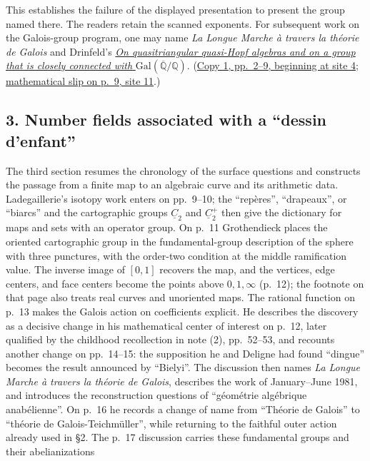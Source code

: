 \documentclass[11pt,a4paper]{article}
\begin{document}
This establishes the
failure of the displayed presentation to present the group named there.
The readers retain the scanned exponents. For subsequent work on the
Galois-group program, one may name \emph{La Longue Marche à travers la
théorie de Galois} and Drinfeld's
\href{https://www.mathnet.ru/eng/aa199}{\emph{On quasitriangular quasi-Hopf algebras and on a group that is closely connected with}
$\mathrm{Gal}(\overline{\mathbb Q}/\mathbb Q)$}.
(\href{https://grothendieck.umontpellier.fr/web/viewer.html?file=../119.pdf\#page=5}{Copy 1, pp.~2--9, beginning at site 4};
\href{https://grothendieck.umontpellier.fr/web/viewer.html?file=../119.pdf\#page=12}{mathematical slip on p.~9, site 11}.)



\subsection*{3. Number fields associated with a ``dessin d'enfant''}
The third section resumes the chronology of the surface questions and
constructs the passage from a finite map to an algebraic curve and its
arithmetic data. Ladegaillerie's isotopy work enters on pp.~9--10; the
``repères'', ``drapeaux'', or ``biarcs'' and the cartographic groups
$\underline C_2$ and $\underline C_2^+$ then give the dictionary for maps
and sets with an operator group. On p.~11 Grothendieck places the oriented
cartographic group in the fundamental-group description of the sphere
with three punctures, with the order-two condition at the middle
ramification value. The inverse image of $[0,1]$ recovers the map, and
the vertices, edge centers, and face centers become the points above
$0,1,\infty$ (p.~12); the footnote on that page also treats real curves
and unoriented maps. The rational function on p.~13 makes the Galois
action on coefficients explicit. He describes the discovery as a decisive
change in his mathematical center of interest on p.~12, later qualified
by the childhood recollection in note (2), pp.~52--53, and recounts
another change on pp.~14--15: the supposition he and Deligne had found
``dingue'' becomes the result announced by ``Bielyi''. The discussion then
names \emph{La Longue Marche à travers la théorie de Galois}, describes
the work of January--June 1981, and introduces the reconstruction questions
of ``géométrie algébrique anabélienne''. On p.~16 he records a change of
name from ``Théorie de Galois'' to ``théorie de Galois-Teichmüller'', while
returning to the faithful outer action already used in \S2. The p.~17
discussion carries these fundamental groups and their abelianizations
\end{document}
